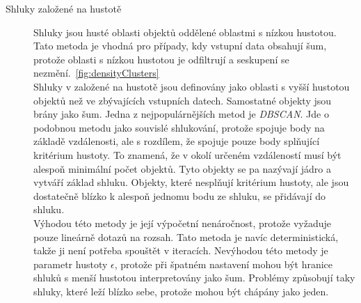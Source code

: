 \begin{description}
\item[Shluky založené na hustotě] Shluky jsou husté oblasti objektů oddělené oblastmi s nízkou hustotou. Tato metoda je vhodná pro případy, kdy vstupní data obsahují šum, protože oblasti s nízkou hustotou je odfiltrují a seskupení se nezmění.~\autoref{fig:densityClusters} \\
Shluky v založené na hustotě jsou definovány jako oblasti s vyšší hustotou objektů než ve zbývajících vstupních datech. Samostatné objekty jsou brány jako šum. Jedna z nejpopulárnějších metod je \textit{DBSCAN}. Jde o podobnou metodu jako souvislé shlukování, protože spojuje body na základě vzdálenosti, ale s rozdílem, že spojuje pouze body splňující kritérium hustoty. To znamená, že v okolí určeném vzdáleností musí být alespoň minimální počet objektů. Tyto objekty se pa nazývají jádro a vytváří základ shluku. Objekty, které nesplňují kritérium hustoty, ale jsou dostatečně blízko k alespoň jednomu bodu ze shluku, se přidávají do shluku. \\
Výhodou této metody je její výpočetní nenáročnost, protože vyžaduje pouze lineárně dotazů na rozsah. Tato metoda je navíc deterministická, takže ji není potřeba spouštět v iteracích.
Nevýhodou této metody je parametr hustoty $\epsilon$, protože při špatném nastavení mohou být hranice shluků s menší hustotou interpretovány jako šum. Problémy způsobují taky shluky, které leží blízko sebe, protože mohou být chápány jako jeden.



\end{description}
